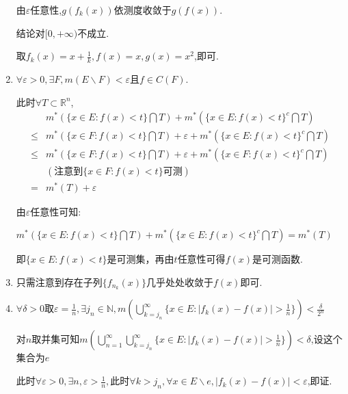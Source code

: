 \documentclass[UTF8, a4paper, 12pt, oneside, onecolumn]{article}
\numberwithin{equation}{section}
\numberwithin{figure}{section}
\numberwithin{table}{section}
\theoremstyle{nonumberplain}	%
\theoremstyle{plain}	%
\theoremstyle{plain}	%
\theoremstyle{plain}	%
\theoremstyle{plain}	%
\theoremstyle{nonumberplain}
\begin{document}
\begin{enumerate}
	由$\varepsilon$任意性,$g(f_k(x))$依测度收敛于$g(f(x))$.
	
	结论对$[0,+\infty)$不成立.
	
	取$\displaystyle f_k(x)=x+\frac{1}{k},f(x)=x,g(x)=x^2$,即可.
	
	\item $\forall \varepsilon >0,\exists F,m(E\backslash F)<\varepsilon$且$f\in C(F)$.
	
	此时$\forall T\subset \mathbb{R}^n$,
	\begin{align*}
	&m^*(\{x\in E:f(x)<t\}\bigcap T)+m^*(\{x\in E:f(x)<t\}^c\bigcap T)\\
	\leqslant&m^*(\{x\in F:f(x)<t\}\bigcap T)+\varepsilon+m^*(\{x\in E:f(x)<t\}^c\bigcap T)\\
	\leqslant&m^*(\{x\in F:f(x)<t\}\bigcap T)+\varepsilon+m^*(\{x\in F:f(x)<t\}^c\bigcap T)\\
	&(\text{注意到}\{x\in F:f(x)<t\}\text{可测})\\
	=&m^*(T)+\varepsilon
	\end{align*}
	
	由$\varepsilon$任意性可知:
	
	$m^*(\{x\in E:f(x)<t\}\bigcap T)+m^*(\{x\in E:f(x)<t\}^c\bigcap T)=m^*(T)$
	
	即$\{x\in E:f(x)<t\}$是可测集，再由$t$任意性可得$f(x)$是可测函数.
	\item 只需注意到存在子列$\{f_{n_k}(x)\} $几乎处处收敛于$f(x)$即可.
	\item $\forall \delta>0$取$\displaystyle\varepsilon=\frac{1}{n},\exists j_n\in \mathbb{N},m(\bigcup_{k = j_n}^{\infty}\{x\in E:|f_k(x)-f(x)|>\frac{1}{n}\})<\frac{\delta}{2^n}$
	
	对$n$取并集可知$\displaystyle m(\bigcup_{n=1}^{\infty}\bigcup_{k = j_n}^{\infty}\{x\in E:|f_k(x)-f(x)|>\frac{1}{n}\})<\delta$,设这个集合为$e$
	
	此时$\displaystyle\forall \varepsilon>0,\exists n,\varepsilon>\frac{1}{n},$此时$\forall k>j_n,\forall x\in E\backslash e,|f_k(x)-f(x)|<\varepsilon$,即证.
\end{enumerate}
\newpage
\end{document}
